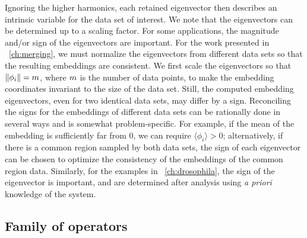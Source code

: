 Ignoring the higher harmonics, each retained eigenvector then describes an intrinsic variable for the data set of interest.
%
We note that the eigenvectors can be determined up to a scaling factor.
%
For some applications, the magnitude and/or sign of the eigenvectors are important. 
%
For the work presented in \chap~\ref{ch:merging}, we must normalize the eigenvectors from different data sets so that the resulting embeddings are consistent.
%
We first scale the eigenvectors so that $\|\phi_i\| = m$, where $m$ is the number of data points,
to make the embedding coordinates invariant to the size of the data set.
%
Still, the computed embedding eigenvectors, even for two identical data sets, may differ by a sign.
%
Reconciling the signs for the embeddings of different data sets can be rationally done in several ways and is somewhat problem-specific.
%
For example, if the mean of the embedding is sufficiently far from 0, we can require $\langle \phi_i \rangle > 0$;
alternatively, if there is a common region sampled by both data sets, the sign of each eigenvector can be chosen to optimize the consistency of the embeddings of the common region data.
%
%
Similarly, for the examples in \chap~\ref{ch:drosophila}, the sign of the eigenvector is important, and are determined after analysis using {\em a priori} knowledge of the system. 




\subsection{Family of operators} \label{sec:diff_limit}

